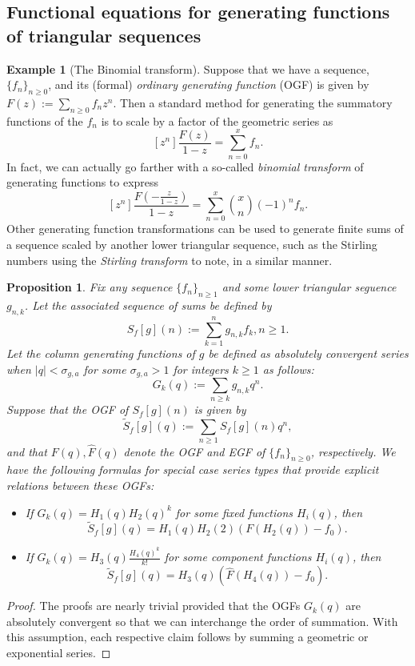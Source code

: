 \documentclass[12pt,reqno,a4letter]{article}
\numberwithin{figure}{section}
\numberwithin{table}{section}
\numberwithin{equation}{section}
\theoremstyle{plain}
\newtheorem{prop}[theorem]{Proposition}
\numberwithin{theorem}{section}
\theoremstyle{definition}
\newtheorem{example}[theorem]{Example}
\begin{document}
\subsection{Functional equations for generating functions of triangular sequences} 

\begin{example}[The Binomial transform]
Suppose that we have a sequence, $\{f_n\}_{n \geq 0}$, and its (formal) 
\emph{ordinary generating function} (OGF) is given by $F(z) := \sum_{n \geq 0} f_n z^n$. 
Then a standard method for generating the summatory functions of the $f_n$ is to scale by a 
factor of the geometric series as 
\[
[z^n] \frac{F(z)}{1-z} = \sum_{n=0}^{x} f_n. 
\]
In fact, we can actually go farther with a so-called \emph{binomial transform} of generating functions 
to express 
\[
[z^n] \frac{F\left(-\frac{z}{1-z}\right)}{1-z} = \sum_{n=0}^{x} \binom{x}{n} (-1)^{n} f_n. 
\]
Other generating function transformations can be used to generate finite sums of a sequence scaled 
by another lower triangular sequence, such as the Stirling numbers using the 
\emph{Stirling transform} to note, in a similar manner. 
\end{example}

\begin{prop}
\label{prop_ClassicalFuncOGFEGFEqns_InitSurveyOfSpCases_v1}
Fix any sequence $\{f_n\}_{n \geq 1}$ and some lower triangular seguence $g_{n,k}$. 
Let the associated sequence of sums be defined by 
\[
S_{f}[g](n) := \sum_{k=1}^{n} g_{n,k} f_k, n \geq 1.
\]
Let the column generating functions of $g$ be defined as 
absolutely convergent series when $|q| < \sigma_{g,a}$ for some $\sigma_{g,a} > 1$ 
for integers $k \geq 1$ as follows:
\[
G_k(q) := \sum_{n \geq k} g_{n,k} q^n. 
\]
Suppose that the OGF of $S_f[g](n)$ is given by 
$$\widetilde{S}_f[g](q) := \sum_{n \geq 1} S_f[g](n) q^n,$$ 
and that $F(q), \widehat{F}(q)$ denote the OGF and EGF of $\{f_n\}_{n \geq 0}$, respectively. 
We have the following formulas for special case series types that provide 
explicit relations between these OGFs:
\begin{itemize}
\item[(A)] If $G_k(q) = H_1(q) H_2(q)^{k}$ for some fixed functions $H_i(q)$, then 
           \[
           \widetilde{S}_f[g](q) = H_1(q) H_2(2)\left(F\left(H_2(q)\right) - f_0\right). 
           \]
\item[(B)] If $G_k(q) = H_3(q) \frac{H_4(q)^k}{k!}$ for some component functions $H_i(q)$, 
           then 
           \[
           \widetilde{S}_f[g](q) = H_3(q) \left(\widehat{F}\left(H_4(q)\right) - f_0\right). 
           \]
\end{itemize} 
\end{prop}
\begin{proof}
The proofs are nearly trivial provided that the OGFs $G_k(q)$ are absolutely convergent 
so that we can interchange the order of summation. With this assumption, each respective claim 
follows by summing a geometric or exponential series. 
\end{proof}
     
\end{document}
